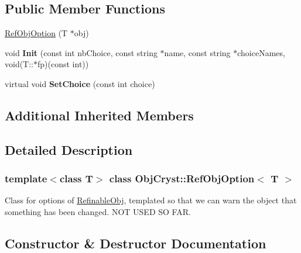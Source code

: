 \subsection*{Public Member Functions}
\begin{DoxyCompactItemize}
\item 
\mbox{\hyperlink{class_obj_cryst_1_1_ref_obj_option_a501cc1ee9602c16d9ccbda004ddae5c3}{Ref\+Obj\+Option}} (T $\ast$obj)
\item 
\mbox{\label{class_obj_cryst_1_1_ref_obj_option_a8369dfcf480e3d788f2ec097a161ab9b}} 
void {\bfseries Init} (const int nb\+Choice, const string $\ast$name, const string $\ast$choice\+Names, void(T\+::$\ast$fp)(const int))
\item 
\mbox{\label{class_obj_cryst_1_1_ref_obj_option_a0df0d2fc9fc233c805847ecbfd6dd457}} 
virtual void {\bfseries Set\+Choice} (const int choice)
\end{DoxyCompactItemize}
\subsection*{Additional Inherited Members}


\subsection{Detailed Description}
\subsubsection*{template$<$class T$>$\newline
class Obj\+Cryst\+::\+Ref\+Obj\+Option$<$ T $>$}

Class for options of \mbox{\hyperlink{class_obj_cryst_1_1_refinable_obj}{Refinable\+Obj}}, templated so that we can warn the object that something has been changed. N\+OT U\+S\+ED SO F\+AR. 

\subsection{Constructor \& Destructor Documentation}
\mbox{\label{class_obj_cryst_1_1_ref_obj_option_a501cc1ee9602c16d9ccbda004ddae5c3}} 
